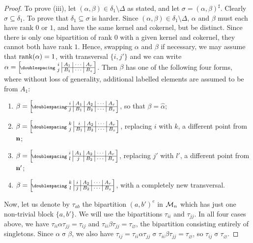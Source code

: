 \begin{lemma}
\begin{proof}
    To prove (iii), let $(\alpha,\beta)\in\delta_1\setminus\Delta$ as stated,
    and let $\sigma = (\alpha,\beta)^\sharp$.  Clearly
    $\sigma \subseteq \delta_1$.  To prove that $\delta_1 \subseteq \sigma$ is
    harder.  Since $(\alpha,\beta) \in \delta_1 \setminus \Delta$, $\alpha$ and
    $\beta$ must each have rank $0$ or $1$, and have the same kernel and
    cokernel, but be distinct.  Since there is only one bipartition of rank $0$
    with a given kernel and cokernel, they cannot both have rank $1$.  Hence,
    swapping $\alpha$ and $\beta$ if necessary, we may assume that
    $\operatorname{rank}(\alpha)=1$, with transversal $\{i,j'\}$ and we can write
    $\alpha=\bipart{c|c|c|c}{2-4}
    {i & A_1 & \cdots & A_r}{j & B_1 & \cdots & B_s}$.
    Then $\beta$ has one of the following four forms, where without loss of
    generality, additional labelled elements are assumed to be from $A_1$:
    \begin{enumerate}[\rm(a)]
    \item $\beta = \bipart{c|c|c|c|c}{1-5}
      {i & A_1 & A_2 & \cdots & A_r}{j & B_1 & B_2 & \cdots & B_s}$,
      so that $\beta = \widehat\alpha$;
    \item $\beta = \bipart{c|c|c|c|c}{2-5}
      {k & i & A_2 & \cdots & A_r}{j & B_1 & B_2 & \cdots & B_s}$,
      replacing $i$ with $k$, a different point from $\mathbf{n}$;
    \item $\beta = \bipart{c|c|c|c|c}{2-5}
      {i & A_1 & A_2 & \cdots & A_r}{l & j & B_2 & \cdots & B_s}$,
      replacing $j'$ with $l'$, a different point from $\mathbf{n}'$;
    \item $\beta = \bipart{c|c|c|c|c}{2-5}
      {k & i & A_2 & \cdots & A_r}{l & j & B_2 & \cdots & B_s}$,
      with a completely new transversal.
    \end{enumerate}
    Now, let us denote by $\tau_{ab}$ the bipartition $(a, b')^e$ in $\mathcal{M}_n$
    which has just one non-trivial block $\{a,b'\}$.  We will use the
    bipartitions $\tau_{ii}$ and $\tau_{jj}$. In all four cases above, we have
    $\tau_{ii}\alpha\tau_{jj}= \tau_{ij}$ and
    $\tau_{ii}\beta\tau_{jj}= \tau_\varnothing$, the bipartition consisting
    entirely of singletons.  Since $\alpha \mathrel\sigma \beta$, we also have
    $\tau_{ij} = \tau_{ii}\alpha\tau_{jj} \mathrel\sigma
    \tau_{ii}\beta\tau_{jj}= \tau_\varnothing$, so
    $\tau_{ij} \mathrel\sigma \tau_\varnothing$.


\end{proof}
\end{lemma}
